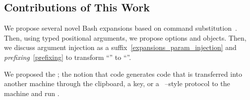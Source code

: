 \subsection{Contributions of This Work}\label{contributions}

We propose several novel Bash expansions based on command substitution~\cite{command_substitution}. Then, using typed positional arguments, we propose options and objects. Then, we discuss argument injection as a suffix~\ref{expansions_param_injection} and \emph{prefixing}~\ref{prefixing} to transform ``'' to ``''. 

We proposed the ; the notion that code generates code that is transferred into another machine through the clipboard, a key, or a ~\cite{scp}--style protocol to  the machine and run . 